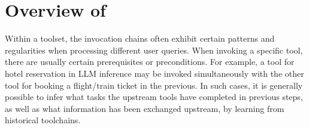 \section{Overview of {\tool}}

{Within a toolset, the invocation chains often exhibit certain patterns and regularities when processing different user queries. 
When invoking a specific tool, there are usually certain prerequisites or preconditions. }
For example, a tool for hotel reservation in LLM inference may be invoked simultaneously with the other tool for booking a flight/train ticket in the previous.
{
In such cases, it is generally possible to infer what tasks the upstream tools have completed in previous steps, as well as what information has been exchanged upstream, by learning from historical toolchains.
}


